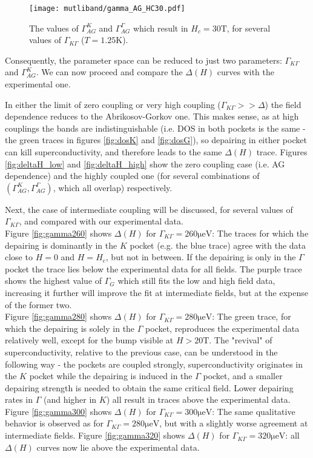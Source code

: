 \documentclass[showpacs,superscriptaddress,onecolumn,prb]{revtex4}
\begin{document}
\begin{figure}[h!]
	\centering
	\texttt{[image: mutliband/gamma\_AG\_HC30.pdf]}
	\caption{The values of $\Gamma_{AG}^K$ and $\Gamma_{AG}^\Gamma$ which result in $H_c=30\mathrm{T}$, for several values of $\Gamma_{K\Gamma}$ ($T=1.25\mathrm{K}$).}
	\label{fig:gammaAGHC30}
\end{figure}


Consequently, the parameter space can be reduced to just two parameters: $\Gamma_{K\Gamma}$ and $\Gamma_{AG}^K$. We can now proceed and compare the $\Delta(H)$ curves with the experimental one.

In either the limit of zero coupling or very high coupling ($\Gamma_{K\Gamma}>>\Delta$) the field dependence reduces to the Abrikosov-Gorkov one. This makes sense, as at high couplings the bands are indistinguishable (i.e. DOS in both pockets is the same - the green traces in figures \ref{fig:dosK} and \ref{fig:dosG}), so depairing in either pocket can kill superconductivity, and therefore leads to the same $\Delta(H)$ trace.
Figures \ref{fig:deltaH_low} and \ref{fig:deltaH_high} show the zero coupling case (i.e. AG dependence) and the highly coupled one (for several combinations of $(\Gamma_{AG}^K,\Gamma_{AG}^\Gamma)$, which all overlap) respectively.

Next, the case of intermediate coupling will be discussed, for several values of $\Gamma_{K\Gamma}$,  and compared with our experimental data.\\
Figure \ref{fig:gamma260} shows $\Delta(H)$ for $\Gamma_{K\Gamma}=260\mathrm{\mu eV}$: The traces for which the depairing is dominantly in the $K$ pocket (e.g. the blue trace) agree with the data close to $H=0$ and $H=H_c$, but not in between. If the depairing is only in the $\Gamma$ pocket the trace lies below the experimental data for all fields. The purple trace shows the highest value of $\Gamma_G$ which still fits the low and high field data, increasing it further will improve the fit at intermediate fields, but at the expense of the former two.\\
Figure \ref{fig:gamma280} shows $\Delta(H)$ for $\Gamma_{K\Gamma}=280\mathrm{\mu eV}$: The green trace, for which the depairing is solely in the $\Gamma$ pocket, reproduces the experimental data relatively well, except for the bump visible at $H>20\mathrm{T}$. The "revival" of superconductivity, relative to the previous case, can be understood in the following way - the pockets are coupled strongly, superconductivity originates in the $K$ pocket while the depairing is induced in the $\Gamma$ pocket, and a smaller depairing strength is needed to obtain the same critical field. Lower depairing rates in $\Gamma$ (and higher in $K$) all result in traces above the experimental data.\\
Figure \ref{fig:gamma300} shows $\Delta(H)$ for $\Gamma_{K\Gamma}=300\mathrm{\mu eV}$: The same qualitative behavior is observed as for $\Gamma_{K\Gamma}=280\mathrm{\mu eV}$, but with a slightly worse agreement at intermediate fields.
Figure \ref{fig:gamma320} shows $\Delta(H)$ for $\Gamma_{K\Gamma}=320\mathrm{\mu eV}$: all $\Delta(H)$ curves now lie above the experimental data.
\end{document}
